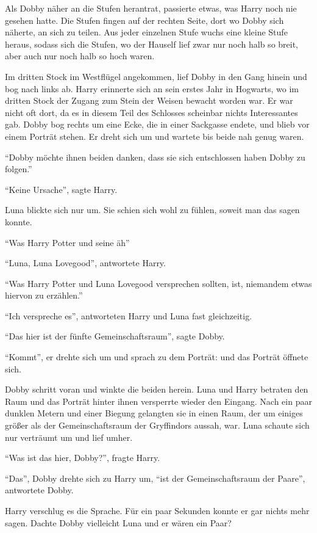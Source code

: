 Als Dobby näher an die Stufen herantrat, passierte etwas, was Harry noch nie gesehen hatte. Die Stufen fingen auf der rechten Seite, dort wo Dobby sich näherte, an sich zu teilen. Aus jeder einzelnen Stufe wuchs eine kleine Stufe heraus, sodass sich die Stufen, wo der Hauself lief zwar nur noch halb so breit, aber auch nur noch halb so hoch waren.

Im dritten Stock im Westflügel angekommen, lief Dobby in den Gang hinein und bog nach links ab. Harry erinnerte sich an sein erstes Jahr in Hogwarts, wo im dritten Stock der Zugang zum Stein der Weisen bewacht worden war. Er war nicht oft dort, da es in diesem Teil des Schlosses scheinbar nichts Interessantes gab. Dobby bog rechts um eine Ecke, die in einer Sackgasse endete, und blieb vor einem Porträt stehen. Er dreht sich um und wartete bis beide nah genug waren.

\enquote{Dobby möchte ihnen beiden danken, dass sie sich entschlossen haben Dobby zu folgen.}

\enquote{Keine Ursache}, sagte Harry.

Luna blickte sich nur um. Sie schien sich wohl zu fühlen, soweit man das sagen konnte.

\enquote{Was Harry Potter und seine \gst äh\abs}

\enquote{Luna, Luna Lovegood}, antwortete Harry.

\enquote{Was Harry Potter und Luna Lovegood versprechen sollten, ist, niemandem etwas hiervon zu erzählen.}

\enquote{Ich verspreche es}, antworteten Harry und Luna fast gleichzeitig.

\enquote{Das hier ist der fünfte Gemeinschaftsraum}, sagte Dobby.

\enquote{Kommt}, er drehte sich um und sprach zu dem Porträt:  und das Porträt öffnete sich.

Dobby schritt voran und winkte die beiden herein. Luna und Harry betraten den Raum und das Porträt hinter ihnen versperrte wieder den Eingang. Nach ein paar dunklen Metern und einer Biegung gelangten sie in einen Raum, der um einiges größer als der Gemeinschaftsraum der Gryffindors aussah, war. Luna schaute sich nur verträumt um und lief umher.

\enquote{Was ist das hier, Dobby?}, fragte Harry.

\enquote{Das}, Dobby drehte sich zu Harry um, \enquote{ist der Gemeinschaftsraum der Paare}, antwortete Dobby.

Harry verschlug es die Sprache. Für ein paar Sekunden konnte er gar nichts mehr sagen. Dachte Dobby vielleicht Luna und er wären ein Paar?

